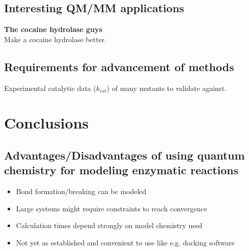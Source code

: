 \newpage
\subsection{Interesting QM/MM applications}
\textbf{The cocaine hydrolase guys}\\
Make a cocaine hydrolase better\cite{gao2006computational}.

\subsection{Requirements for advancement of methods}
Experimental catalytic data ($k_\text{cat}$) of many mutants to validate against.


\section{Conclusions}\label{sec:conclusions}

\subsection{Advantages/Disadvantages of using quantum chemistry for modeling enzymatic reactions}
\begin{itemize}
\item Bond formation/breaking can be modeled
\item Large systems might require constraints to reach convergence
\item Calculation times depend strongly on model chemistry used
\item Not yet as established and convenient to use like e.g. docking software
\end{itemize}
